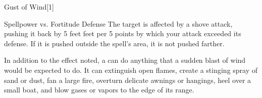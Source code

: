 \begin{spellsection}{Gust of Wind}[1]
    \begin{spellheader}
    \end{spellheader}
    \begin{spellcontent}
        \begin{spelltargetinginfo}
        \end{spelltargetinginfo}
        \begin{spelleffects}
            \begin{spellattack}{Spellpower vs. Fortitude Defense}
                \spellsuccess The target is affected by a shove attack, pushing it back by 5 feet  feet per 5 points by which your attack exceeded its defense. If it is pushed outside the spell's area, it is not pushed farther.
            \end{spellattack}
        \end{spelleffects}
    \end{spellcontent}
    \begin{spellfooter}
        \spellnotes In addition to the effect noted, a  can do anything that a sudden blast of wind would be expected to do. It can extinguish open flames, create a stinging spray of sand or dust, fan a large fire, overturn delicate awnings or hangings, heel over a small boat, and blow gases or vapors to the edge of its range.
        \miscastexplode
    \end{spellfooter}
    \begin{spellaugments}
    \end{spellaugments}
\end{spellsection}


